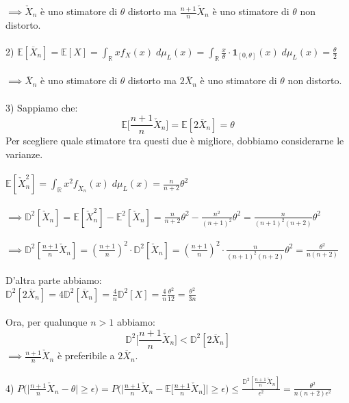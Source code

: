\documentclass{article}
\begin{document}
$\implies \check{X}_{n}$ è uno stimatore di $\theta$ distorto ma $\frac{n+1}{n}\check{X}_{n}$ è uno stimatore di $\theta$ non distorto.\\
\\
2) $\mathbb{E}[\overline{X}_{n}] = \mathbb{E}[X] = \int_{\mathbb{R}}^{}xf_{X}(x) \; d\mu_{L}(x) = \int_{\mathbb{R}}^{}\frac{x}{\theta}\cdot \mathbf{1}_{[0,\theta]}(x) \; d\mu_{L}(x) = \frac{\theta}{2}$\\ \\
$\implies \overline{X}_{n}$ è uno stimatore di $\theta$ distorto ma $2 \overline{X}_{n}$ è uno stimatore di $\theta$ non distorto.\\
\\
3) Sappiamo che:
\[ \mathbb{E}\Big[\frac{n+1}{n}\check{X}_{n}\Big] = \mathbb{E}[2 \overline{X}_{n}] = \theta \]
Per scegliere quale stimatore tra questi due è migliore, dobbiamo considerarne le varianze.\\ \\
$\mathbb{E}[\check{X}^{2}_{n}] = \int_{\mathbb{R}}^{}x^{2}f_{\check{X}_{n}}(x) \; d\mu_{L}(x) = \frac{n}{n+2}\theta^{2}$\\ \\
$\implies \mathbb{D}^{2}[\check{X}_{n}] = \mathbb{E}[\check{X}^{2}_{n}] - \mathbb{E}^{2}[\check{X}_{n}] = \frac{n}{n+2}\theta^{2} - \frac{n^{2}}{(n+1)^{2}}\theta^{2} = \frac{n}{(n+1)^{2}(n+2)}\theta^{2}$\\ \\
$\implies \mathbb{D}^{2}[\frac{n+1}{n}\check{X}_{n}] = (\frac{n+1}{n})^{2}\cdot \mathbb{D}^{2}[\check{X}_{n}] = (\frac{n+1}{n})^{2}\cdot \frac{n}{(n+1)^{2}(n+2)}\theta^{2} = \frac{\theta^{2}}{n(n+2)}$\\
\\
D'altra parte abbiamo:\\
$\mathbb{D}^{2}[2 \overline{X}_{n}] = 4\mathbb{D}^{2}[\overline{X}_{n}] = \frac{4}{n}\mathbb{D}^{2}[X] = \frac{4}{n}\frac{\theta^{2}}{12} = \frac{\theta^{2}}{3n}$\\
\\
Ora, per qualunque $n>1$ abbiamo:
\[ \mathbb{D}^{2}\Big[\frac{n+1}{n}\check{X}_{n}\Big] < \mathbb{D}^{2}[2 \overline{X}_{n}] \]
$\implies \frac{n+1}{n}\check{X}_{n}$ è preferibile a $2 \overline{X}_{n}$.\\
\\
4) $P\Big(\Big|\frac{n+1}{n}\check{X}_{n} - \theta \Big| \geq \epsilon \Big) = P\Big(\Big|\frac{n+1}{n}\check{X}_{n} - \mathbb{E}\Big[\frac{n+1}{n}\check{X}_{n}\Big]\Big| \geq \epsilon \Big) \leq \frac{\mathbb{D}^{2}[\frac{n+1}{n}\check{X}_{n}]}{\epsilon^{2}} = \frac{\theta^{2}}{n(n+2)\epsilon^{2}}$\\ \\
\end{document}

